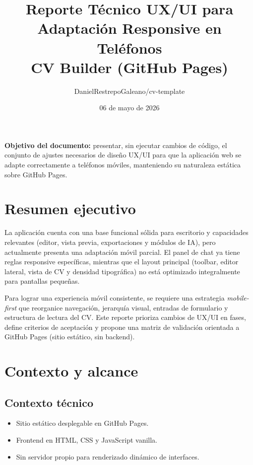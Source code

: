 \documentclass[12pt,a4paper]{article}
\title{\textbf{Reporte Técnico UX/UI para Adaptación Responsive en Teléfonos}\\\large CV Builder (GitHub Pages)}
\author{DanielRestrepoGaleano/cv-template}
\date{06 de mayo de 2026}
\begin{document}
\maketitle
\thispagestyle{empty}

\vspace{0.5cm}
\noindent\textbf{Objetivo del documento:} presentar, sin ejecutar cambios de código, el conjunto de ajustes necesarios de diseño UX/UI para que la aplicación web se adapte correctamente a teléfonos móviles, manteniendo su naturaleza estática sobre GitHub Pages.

\vspace{0.8cm}
\tableofcontents
\newpage

\section{Resumen ejecutivo}
La aplicación cuenta con una base funcional sólida para escritorio y capacidades relevantes (editor, vista previa, exportaciones y módulos de IA), pero actualmente presenta una adaptación móvil parcial. El panel de chat ya tiene reglas responsive específicas, mientras que el layout principal (toolbar, editor lateral, vista de CV y densidad tipográfica) no está optimizado integralmente para pantallas pequeñas.

Para lograr una experiencia móvil consistente, se requiere una estrategia \textit{mobile-first} que reorganice navegación, jerarquía visual, entradas de formulario y estructura de lectura del CV. Este reporte prioriza cambios de UX/UI en fases, define criterios de aceptación y propone una matriz de validación orientada a GitHub Pages (sitio estático, sin backend).

\section{Contexto y alcance}
\subsection{Contexto técnico}
\begin{itemize}[leftmargin=1.2cm]
  \item Sitio estático desplegable en GitHub Pages.
  \item Frontend en HTML, CSS y JavaScript vanilla.
  \item Sin servidor propio para renderizado dinámico de interfaces.
\end{itemize}
\end{document}
